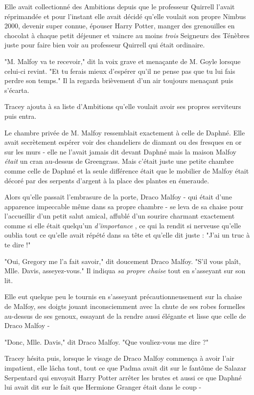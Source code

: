 Elle avait collectionné des Ambitions depuis que le professeur Quirrell l'avait réprimandée et pour l'instant elle avait décidé qu'elle voulait son propre Nimbus 2000, devenir super connue, épouser Harry Potter, manger des grenouilles en chocolat à chaque petit déjeuner et vaincre au moins \emph{trois}  Seigneurs des Ténèbres juste pour faire bien voir au professeur Quirrell qui était ordinaire.

"M. Malfoy va te recevoir," dit la voix grave et menaçante de M. Goyle lorsque celui-ci revint. "Et tu ferais mieux d'espérer qu'il ne pense pas que tu lui fais perdre son temps." Il la regarda brièvement d'un air toujours menaçant puis s'écarta.

Tracey ajouta à sa liste d'Ambitions qu'elle voulait avoir ses propres serviteurs puis entra.

Le chambre privée de M. Malfoy ressemblait exactement à celle de Daphné. Elle avait secrètement espérer voir des chandeliers de diamant ou des fresques en or sur les murs - elle ne l'avait jamais dit devant Daphné mais la maison Malfoy \emph{était}  un cran au-dessus de Greengrass. Mais c'était juste une petite chambre comme celle de Daphné et la seule différence était que le mobilier de Malfoy était décoré par des serpents d'argent à la place des plantes en émeraude.

Alors qu'elle passait l'embrasure de la porte, Draco Malfoy - qui était d'une apparence impeccable même dans sa propre chambre - se leva de sa chaise pour l'accueillir d'un petit salut amical, affublé d'un sourire charmant exactement comme si elle était quelqu'un \emph{d'importance} , ce qui la rendit si nerveuse qu'elle oublia tout ce qu'elle avait répété dans sa tête et qu'elle dit juste : "J'ai un truc à te dire !"

"Oui, Gregory me l'a fait savoir," dit doucement Draco Malfoy. "S'il vous plaît, Mlle. Davis, asseyez-vous." Il indiqua \emph{sa propre chaise}  tout en s'asseyant sur son lit.

Elle eut quelque peu le tournis en s'asseyant précautionneusement sur la chaise de Malfoy, ses doigts jouant inconsciemment avec la chute de ses robes formelles au-dessus de ses genoux, essayant de la rendre aussi élégante et lisse que celle de Draco Malfoy -

"Donc, Mlle. Davis," dit Draco Malfoy. "Que vouliez-vous me dire ?"

Tracey hésita puis, lorsque le visage de Draco Malfoy commença à avoir l'air impatient, elle lâcha tout, tout ce que Padma avait dit sur le fantôme de Salazar Serpentard qui envoyait Harry Potter arrêter les brutes et aussi ce que Daphné lui avait dit sur le fait que Hermione Granger était dans le coup -

